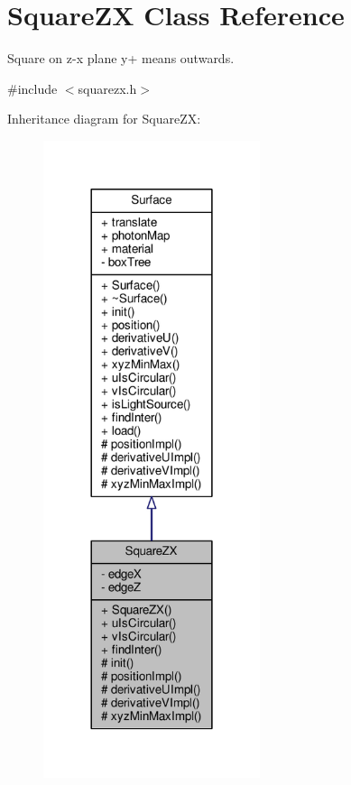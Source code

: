 \hypertarget{classSquareZX}{}\section{Square\+ZX Class Reference}
\label{classSquareZX}


Square on z-\/x plane y+ means outwards.  




{\ttfamily \#include $<$squarezx.\+h$>$}



Inheritance diagram for Square\+ZX\+:
\nopagebreak
\begin{figure}[H]
\begin{center}
\leavevmode
\includegraphics[width=180pt]{classSquareZX__inherit__graph}
\end{center}
\end{figure}


